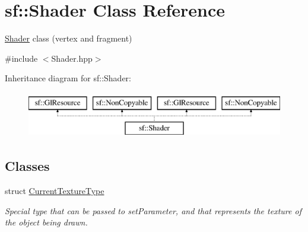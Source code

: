 \hypertarget{classsf_1_1_shader}{\section{sf\-:\-:Shader Class Reference}
\label{classsf_1_1_shader}
}


\hyperlink{classsf_1_1_shader}{Shader} class (vertex and fragment)  




{\ttfamily \#include $<$Shader.\-hpp$>$}

Inheritance diagram for sf\-:\-:Shader\-:\begin{figure}[H]
\begin{center}
\leavevmode
\includegraphics[height=2.000000cm]{classsf_1_1_shader}
\end{center}
\end{figure}
\subsection*{Classes}
\begin{DoxyCompactItemize}
\item 
struct \hyperlink{structsf_1_1_shader_1_1_current_texture_type}{Current\-Texture\-Type}
\begin{DoxyCompactList}\small\item\em Special type that can be passed to set\-Parameter, and that represents the texture of the object being drawn. \end{DoxyCompactList}\end{DoxyCompactItemize}
